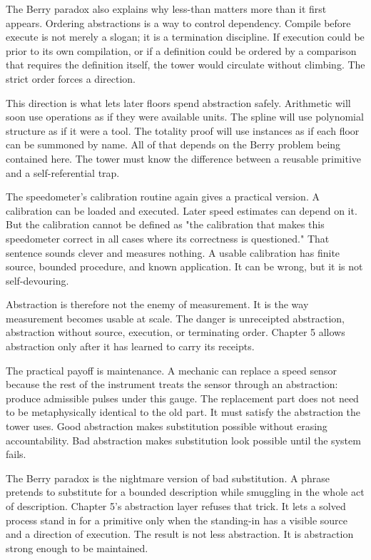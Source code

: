 The Berry paradox also explains why less-than matters more than it first
appears. Ordering abstractions is a way to control dependency. Compile before
execute is not merely a slogan; it is a termination discipline. If execution
could be prior to its own compilation, or if a definition could be ordered by a
comparison that requires the definition itself, the tower would circulate
without climbing. The strict order forces a direction.

This direction is what lets later floors spend abstraction safely. Arithmetic
will soon use operations as if they were available units. The spline will use
polynomial structure as if it were a tool. The totality proof will use
instances as if each floor can be summoned by name. All of that depends on the
Berry problem being contained here. The tower must know the difference between
a reusable primitive and a self-referential trap.

The speedometer's calibration routine again gives a practical version. A
calibration can be loaded and executed. Later speed estimates can depend on it.
But the calibration cannot be defined as "the calibration that makes this
speedometer correct in all cases where its correctness is questioned." That
sentence sounds clever and measures nothing. A usable calibration has finite
source, bounded procedure, and known application. It can be wrong, but it is
not self-devouring.

Abstraction is therefore not the enemy of measurement. It is the way
measurement becomes usable at scale. The danger is unreceipted abstraction,
abstraction without source, execution, or terminating order. Chapter 5 allows
abstraction only after it has learned to carry its receipts.

The practical payoff is maintenance. A mechanic can replace a speed sensor
because the rest of the instrument treats the sensor through an abstraction:
produce admissible pulses under this gauge. The replacement part does not need
to be metaphysically identical to the old part. It must satisfy the abstraction
the tower uses. Good abstraction makes substitution possible without erasing
accountability. Bad abstraction makes substitution look possible until the
system fails.

The Berry paradox is the nightmare version of bad substitution. A phrase
pretends to substitute for a bounded description while smuggling in the whole
act of description. Chapter 5's abstraction layer refuses that trick. It lets a
solved process stand in for a primitive only when the standing-in has a visible
source and a direction of execution. The result is not less abstraction. It is
abstraction strong enough to be maintained.

